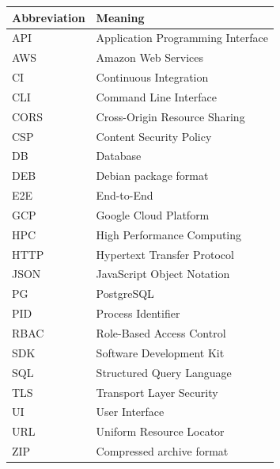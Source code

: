 \documentclass[11pt,a4paper]{article}
\begin{document}
\begin{tabularx}{\textwidth}{@{}lX@{}}
\textbf{Abbreviation} & \textbf{Meaning} \\
\hline

API  & Application Programming Interface \\
AWS  & Amazon Web Services \\
CI   & Continuous Integration \\
CLI  & Command Line Interface \\
CORS & Cross-Origin Resource Sharing \\
CSP  & Content Security Policy \\
DB   & Database \\
DEB  & Debian package format \\
E2E  & End-to-End \\
GCP  & Google Cloud Platform \\
HPC  & High Performance Computing \\
HTTP & Hypertext Transfer Protocol \\
JSON & JavaScript Object Notation \\
PG   & PostgreSQL \\
PID  & Process Identifier \\
RBAC & Role-Based Access Control \\
SDK  & Software Development Kit \\
SQL  & Structured Query Language \\
TLS  & Transport Layer Security \\
UI   & User Interface \\
URL  & Uniform Resource Locator \\
ZIP  & Compressed archive format \\

\end{tabularx}

\clearpage
{}
\setcounter{page}{1}










\end{document}
